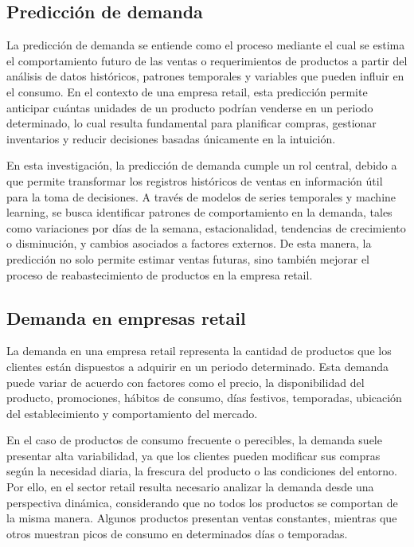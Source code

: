 \subsection{Predicción de demanda}

La predicción de demanda se entiende como el proceso mediante el cual se estima el comportamiento futuro de las ventas o requerimientos de productos a partir del análisis de datos históricos, patrones temporales y variables que pueden influir en el consumo. En el contexto de una empresa retail, esta predicción permite anticipar cuántas unidades de un producto podrían venderse en un periodo determinado, lo cual resulta fundamental para planificar compras, gestionar inventarios y reducir decisiones basadas únicamente en la intuición.

En esta investigación, la predicción de demanda cumple un rol central, debido a que permite transformar los registros históricos de ventas en información útil para la toma de decisiones. A través de modelos de series temporales y machine learning, se busca identificar patrones de comportamiento en la demanda, tales como variaciones por días de la semana, estacionalidad, tendencias de crecimiento o disminución, y cambios asociados a factores externos. De esta manera, la predicción no solo permite estimar ventas futuras, sino también mejorar el proceso de reabastecimiento de productos en la empresa retail.

\subsection{Demanda en empresas retail}

La demanda en una empresa retail representa la cantidad de productos que los clientes están dispuestos a adquirir en un periodo determinado. Esta demanda puede variar de acuerdo con factores como el precio, la disponibilidad del producto, promociones, hábitos de consumo, días festivos, temporadas, ubicación del establecimiento y comportamiento del mercado.

En el caso de productos de consumo frecuente o perecibles, la demanda suele presentar alta variabilidad, ya que los clientes pueden modificar sus compras según la necesidad diaria, la frescura del producto o las condiciones del entorno. Por ello, en el sector retail resulta necesario analizar la demanda desde una perspectiva dinámica, considerando que no todos los productos se comportan de la misma manera. Algunos productos presentan ventas constantes, mientras que otros muestran picos de consumo en determinados días o temporadas.

